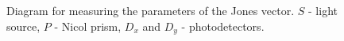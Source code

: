 \begin{figure}
\centering



\caption{Diagram for measuring the parameters of the Jones vector. $S$ - light source, $P$
  - Nicol prism, $D_x$ and $D_y$ -
photodetectors.}
\label{figPart3EntangJones}
\end{figure}